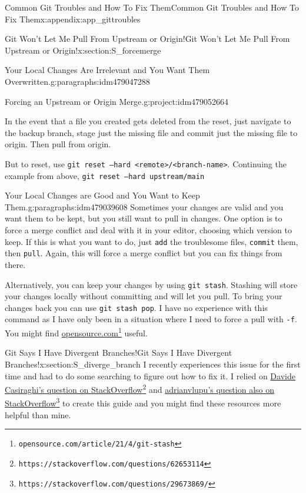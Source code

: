 \documentclass[oneside,10pt,]{book}
\newcommand{\mono}[1]{\texttt{#1}}
\begin{document}
\begin{appendixptx}{Common Git Troubles and How To Fix Them}{}{Common Git Troubles and How To Fix Them}{}{}{x:appendix:app_gittroubles}
\begin{sectionptx}{Git Won't Let Me Pull From Upstream or Origin!}{}{Git Won't Let Me Pull From Upstream or Origin!}{}{}{x:section:S_forcemerge}
\begin{paragraphs}{Your Local Changes Are Irrelevant and You Want Them Overwritten.}{g:paragraphs:idm479047288}
\begin{project}{Forcing an Upstream or Origin Merge.}{g:project:idm479052664}
\begin{enumerate}[font=\bfseries,label=(\alph*),ref=\alph*]
\par
In the event that a file you created gets deleted from the reset, just navigate to the backup branch, stage just the missing file and commit just the missing file to origin. Then pull from origin.%
\par
But to reset, use \mono{git reset --hard <remote>/<branch-name>}. Continuing the example from above, \mono{git reset --hard upstream/main}%
\end{enumerate}
\end{project}%
\end{paragraphs}%
\begin{paragraphs}{Your Local Changes are Good and You Want to Keep Them.}{g:paragraphs:idm479039608}%
Sometimes your changes are valid and you want them to be kept, but you still want to pull in changes. One option is to force a merge conflict and deal with it in your editor, choosing which version to keep. If this is what you want to do, just \mono{add} the troublesome files, \mono{commit} them, then \mono{pull}. Again, this will force a merge conflict but you can fix things from there.%
\par
Alternatively, you can keep your changes by using \mono{git stash}. Stashing will store your changes locally without committing and will let you pull. To bring your changes back you can use \mono{git stash pop}. I have no experience with this command as I have only been in a situation where I need to force a pull with \mono{-f}. You might find \href{https://opensource.com/article/21/4/git-stash}{opensource.com}\footnote{\nolinkurl{opensource.com/article/21/4/git-stash}\label{g:fn:idm479042552}} useful.%
\end{paragraphs}%
\end{sectionptx}
%
%
\typeout{************************************************}
\typeout{************************************************}
%
\begin{sectionptx}{Git Says I Have Divergent Branches!}{}{Git Says I Have Divergent Branches!}{}{}{x:section:S_diverge_branch}
I recently experiences this issue for the first time and had to do some searching to figure out how to fix it. I relied on \href{https://stackoverflow.com/questions/62653114}{Davide Casiraghi's question on StackOverflow}\footnote{\nolinkurl{https://stackoverflow.com/questions/62653114}\label{g:fn:idm479039736}} and \href{https://stackoverflow.com/questions/29673869/}{adrianvlupu's question also on StackOverflow}\footnote{\nolinkurl{https://stackoverflow.com/questions/29673869/}\label{g:fn:idm479040888}} to create this guide and you might find these resources more helpful than mine.%

\end{sectionptx}
\end{appendixptx}
\end{document}
